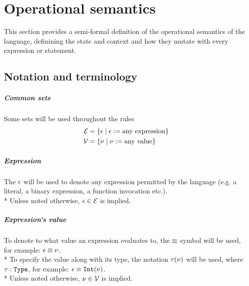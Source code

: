 \chapter{Operational semantics}
\label{ch:opsem}

This section provides a semi-formal definition of the operational semantics of
the language, definining the state and context and how they mutate with every
expression or statement.

\section{Notation and terminology}

\paragraph{Common sets} Some sets will be used throughout the rules
\[
	\begin{split}
		\mathcal{E} &= \left\{\epsilon \mid \epsilon := \text{any expression}\right\} \\*
		\mathcal{V}  &= \left\{\nu \mid \nu := \text{any value}\right\} \\*
	\end{split}
\]

\paragraph{Expression} The $\epsilon$ will be used to denote any expression
permitted by the language (e.g. a literal, a binary expression, a function
invocation etc.).\\*
Unless noted otherwise, $\epsilon \in \mathcal{E}$ is implied.

\paragraph{Expression's value} To denote to what value an expression evaluates
to, the $\equiv$ symbol will be used, for example: $\epsilon \equiv \nu$.\\*
To specify the value along with its type, the notation $\tau(\nu)$ will be
used, where $\tau:\texttt{Type}$, for example: $\epsilon\equiv\texttt{Int}(\nu)$.\\*
Unless noted otherwise, $\nu \in \mathcal{V}$ is implied.

